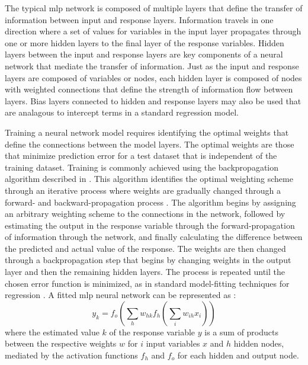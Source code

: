 \documentclass[article,shortnames]{jss}
\begin{document}
The typical \ac{mlp} network is composed of multiple layers that define the transfer of information between input and response layers.  Information travels in one direction where a set of values for variables in the input layer propagates through one or more hidden layers to the final layer of the response variables. Hidden layers between the input and response layers are key components of a neural network that mediate the transfer of information.  Just as the input and response layers are composed of variables or nodes, each hidden layer is composed of nodes with weighted connections that define the strength of information flow between layers.  Bias layers connected to hidden and response layers may also be used that are analagous to intercept terms in a standard regression model.

Training a neural network model requires identifying the optimal weights that define the connections between the model layers.  The optimal weights are those that minimize prediction error for a test dataset that is independent of the training dataset.  Training is commonly achieved using the backpropagation algorithm described in \citet{Rumelhart86}.  This algorithm identifies the optimal weighting scheme through an iterative process where weights are gradually changed through a forward- and backward-propagation process \citep{Rumelhart86,Lek00}.  The algorithm begins by assigning an arbitrary weighting scheme to the connections in the network, followed by estimating the output in the response variable through the forward-propagation of information through the network, and finally calculating the difference between the predicted and actual value of the response.  The weights are then changed through a backpropagation step that begins by changing weights in the output layer and then the remaining hidden layers.  The process is repeated until the chosen error function is minimized, as in standard model-fitting techniques for regression \citep{Cheng94}.  A fitted \ac{mlp} neural network can be represented as \citep{Bishop95,Venables02}:
\begin{equation}
y_k = f_o \left(\sum\limits_{h} w_{hk}f_h \left( \sum\limits_{i} w_{ih}x_i\right) \right)
\end{equation}
where the estimated value $k$ of the response variable $y$ is a sum of products between the respective weights $w$ for $i$ input variables $x$ and $h$ hidden nodes, mediated by the activation functions $f_h$ and $f_o$ for each hidden and output node.
\end{document}
